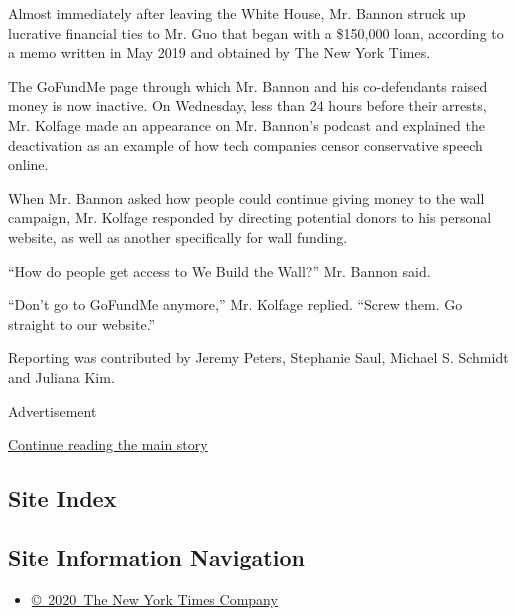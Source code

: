 Almost immediately after leaving the White House, Mr. Bannon struck up
lucrative financial ties to Mr. Guo that began with a \$150,000 loan,
according to a memo written in May 2019 and obtained by The New York
Times.

The GoFundMe page through which Mr. Bannon and his co-defendants raised
money is now inactive. On Wednesday, less than 24 hours before their
arrests, Mr. Kolfage made an appearance on Mr. Bannon's podcast and
explained the deactivation as an example of how tech companies censor
conservative speech online.

When Mr. Bannon asked how people could continue giving money to the wall
campaign, Mr. Kolfage responded by directing potential donors to his
personal website, as well as another specifically for wall funding.

``How do people get access to We Build the Wall?'' Mr. Bannon said.

``Don't go to GoFundMe anymore,'' Mr. Kolfage replied. ``Screw them. Go
straight to our website.''

Reporting was contributed by Jeremy Peters, Stephanie Saul, Michael S.
Schmidt and Juliana Kim.

Advertisement

\protect\hyperlink{after-bottom}{Continue reading the main story}

\hypertarget{site-index}{%
\subsection{Site Index}\label{site-index}}

\hypertarget{site-information-navigation}{%
\subsection{Site Information
Navigation}\label{site-information-navigation}}

\begin{itemize}
\tightlist
\item
  \href{https://help.nytimes3xbfgragh.onion/hc/en-us/articles/115014792127-Copyright-notice}{©~2020~The
  New York Times Company}
\end{itemize}

